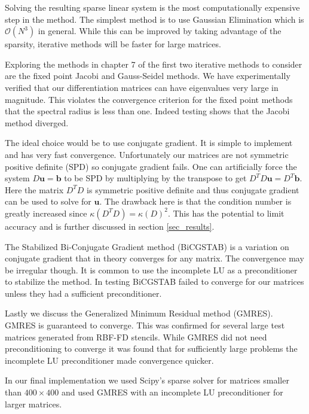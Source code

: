 \documentclass[12pt]{article}
\let\vec\mathbf
\begin{document}
	Solving the resulting sparse linear system is the most computationally expensive step in the method. The simplest method is to use Gaussian Elimination which is $\mathcal{O}(N^3)$ in general. While this can be improved by taking advantage of the sparsity, iterative methods will be faster for large matrices.
	
	Exploring the methods in chapter 7 of \cite{Ascher2011} the first two iterative methods to consider are the fixed point Jacobi and Gauss-Seidel methods. We have experimentally verified that our differentiation matrices can have eigenvalues very large in magnitude. This violates the convergence criterion for the fixed point methods that the spectral radius is less than one. Indeed testing shows that the Jacobi method diverged. 
	
	The ideal choice would be to use conjugate gradient. It is simple to implement and has very fast convergence. Unfortunately our matrices are not symmetric positive definite (SPD) so conjugate gradient fails. One can artificially force the system $D\vec{u}=\vec{b}$ to be SPD by multiplying by the transpose to get $D^TD\vec{u} = D^T \vec{b}$. Here the matrix $D^TD$ is symmetric positive definite and thus conjugate gradient can be used to solve for $\vec{u}$. The drawback here is that the condition number is greatly increased since $\kappa(D^TD) = \kappa(D)^2$. This has the potential to limit accuracy and is further discussed in section \ref{sec_results}. 
	
	The Stabilized Bi-Conjugate Gradient method (BiCGSTAB) is a variation on conjugate gradient that in theory converges for any matrix. The convergence may be irregular though. It is common to use the incomplete LU as a preconditioner to stabilize the method. In testing BiCGSTAB failed to converge for our matrices unless they had a sufficient preconditioner. 
	
	Lastly we discuss the Generalized Minimum Residual method (GMRES). GMRES is guaranteed to converge. This was confirmed for several large test matrices generated from RBF-FD stencils. While GMRES did not need preconditioning to converge it was found that for sufficiently large problems the incomplete LU preconditioner made convergence quicker.
	
	In our final implementation we used Scipy's sparse solver for matrices smaller than $400 \times 400$ and used GMRES with an incomplete LU preconditioner for larger matrices.

\end{document}
